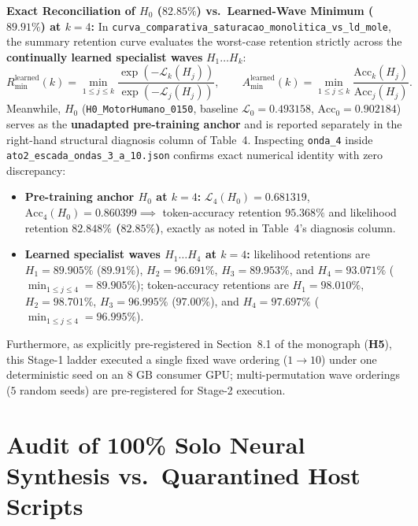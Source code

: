 \documentclass[10pt,a4paper]{article}
\begin{document}
\textbf{Exact Reconciliation of $H_0$ ($82.85\%$) vs.\ Learned-Wave Minimum ($89.91\%$) at $k=4$:}
In \texttt{curva\_\allowbreak{}comparativa\_\allowbreak{}saturacao\_\allowbreak{}monolitica\_\allowbreak{}vs\_\allowbreak{}ld\_\allowbreak{}mole}, the summary retention curve evaluates the worst-case retention strictly across the \textbf{continually learned specialist waves} $H_1\dots H_k$:
\begin{equation}
  R_{\min}^{\text{learned}}(k) = \min_{1 \le j \le k} \frac{\exp(-\mathcal{L}_k(H_j))}{\exp(-\mathcal{L}_j(H_j))}, \qquad
  A_{\min}^{\text{learned}}(k) = \min_{1 \le j \le k} \frac{\text{Acc}_k(H_j)}{\text{Acc}_j(H_j)}.
\end{equation}
Meanwhile, $H_0$ (\texttt{H0\_\allowbreak{}MotorHumano\_\allowbreak{}0150}, baseline $\mathcal{L}_0 = 0.493158$, $\text{Acc}_0 = 0.902184$) serves as the \textbf{unadapted pre-training anchor} and is reported separately in the right-hand structural diagnosis column of Table~4. Inspecting \texttt{onda\_4} inside \texttt{ato2\_\allowbreak{}escada\_\allowbreak{}ondas\_\allowbreak{}3\_\allowbreak{}a\_\allowbreak{}10.json} confirms exact numerical identity with zero discrepancy:
\begin{itemize}
  \item \textbf{Pre-training anchor $H_0$ at $k=4$:} $\mathcal{L}_4(H_0) = 0.681319$, $\text{Acc}_4(H_0) = 0.860399 \implies$ token-accuracy retention $95.368\%$ and likelihood retention \textbf{$82.848\%$ ($82.85\%$)}, exactly as noted in Table~4's diagnosis column.
  \item \textbf{Learned specialist waves $H_1\dots H_4$ at $k=4$:} likelihood retentions are $H_1 = \mathbf{89.905\%}$ ($89.91\%$), $H_2 = 96.691\%$, $H_3 = 89.953\%$, and $H_4 = 93.071\%$ ($\min_{1\le j\le 4} = \mathbf{89.905\%}$); token-accuracy retentions are $H_1 = 98.010\%$, $H_2 = 98.701\%$, $H_3 = \mathbf{96.995\%}$ ($97.00\%$), and $H_4 = 97.697\%$ ($\min_{1\le j\le 4} = \mathbf{96.995\%}$).
\end{itemize}
Furthermore, as explicitly pre-registered in Section~8.1 of the monograph (\textbf{H5}), this Stage-1 ladder executed a single fixed wave ordering ($1 \to 10$) under one deterministic seed on an $8\text{ GB}$ consumer GPU; multi-permutation wave orderings ($5$ random seeds) are pre-registered for Stage-2 execution.

\section{Audit of 100\% Solo Neural Synthesis vs.\ Quarantined Host Scripts}
\end{document}

